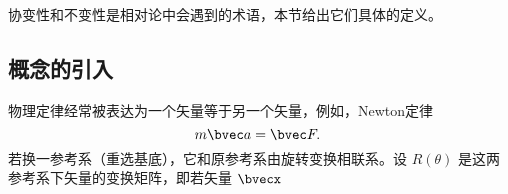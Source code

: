 
协变性和不变性是相对论中会遇到的术语，本节给出它们具体的定义。
\subsection{概念的引入}
物理定律经常被表达为一个矢量等于另一个矢量，例如，Newton定律 
\begin{equation}
m\bvec a=\bvec F.~
\end{equation}
若换一参考系（重选基底），它和原参考系由旋转变换相联系。设 $R(\theta)$ 是这两参考系下矢量的变换矩阵，即若矢量 $\bvecx$








